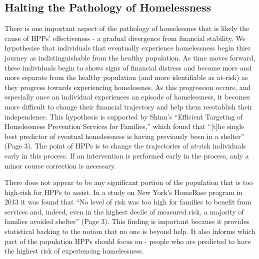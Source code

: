 \documentclass[12pt]{report}
\begin{document}
\subsection{Halting the Pathology of Homelessness}
There is one important aspect of the pathology of homelessnes that is likely the cause of HPPs' effectiveness - a gradual divergence from financial stability. We hypothesise that individuals that eventually experience homelessness begin thier journey as indistinguishable from the healthy population. As time moves forward, these individuals begin to shows signs of financial distress and become more and more separate from the healthy population (and more identifiable as at-risk) as they progress towards experiencing homelessnes. As this progression occurs, and especially once an individual experiences an episode of homelessness, it becomes more difficult to change their financial trajectory and help them reestablish their independence. This hypothesis is supported by Shinn's ``Efficient Targeting of Homelessness Prevention Services for Families,'' which found that ``[t]he single best predictor of eventual homelessness is having previously been in a shelter'' \cite{shinn2019homelessness} (Page 3). The point of HPPs is to change the trajectories of at-risk individuals early in this process. If an intervention is performed early in the process, only a minor course correction is necessary. 

There does not appear to be any significant portion of the population that is too high-risk for HPPs to assist. In a study on New York's HomeBase program in 2013 it was found that ``No level of risk was too high for families to benefit from services and, indeed, even in the highest decile of measured risk, a majority of families avoided shelter'' \cite{shinn2013efficient} (Page 3). This finding is important because it provides statistical backing to the notion that no one is beyond help. It also informs which part of the population HPPs should focus on - people who are predicted to have the highest risk of experiencing homelessness.
\end{document}
